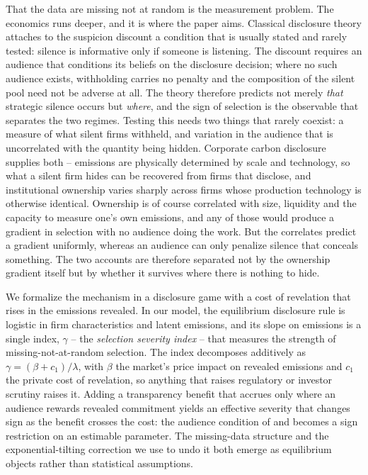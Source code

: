 \documentclass[a4paper,12pt]{article}
\newcommand{\citet}[1]{\textcite{#1}}
\begin{document}
That the data are missing not at random is the measurement problem. The economics runs deeper, and it is where the paper aims. Classical disclosure theory attaches to the suspicion discount a condition that is usually stated and rarely tested: silence is informative only if someone is listening. The discount requires an audience that conditions its beliefs on the disclosure decision; where no such audience exists, withholding carries no penalty and the composition of the silent pool need not be adverse at all. The theory therefore predicts not merely \emph{that} strategic silence occurs but \emph{where}, and the sign of selection is the observable that separates the two regimes. Testing this needs two things that rarely coexist: a measure of what silent firms withheld, and variation in the audience that is uncorrelated with the quantity being hidden. Corporate carbon disclosure supplies both -- emissions are physically determined by scale and technology, so what a silent firm hides can be recovered from firms that disclose, and institutional ownership varies sharply across firms whose production technology is otherwise identical. Ownership is of course correlated with size, liquidity and the capacity to measure one's own emissions, and any of those would produce a gradient in selection with no audience doing the work. But the correlates predict a gradient uniformly, whereas an audience can only penalize silence that conceals something. The two accounts are therefore separated not by the ownership gradient itself but by whether it survives where there is nothing to hide.

We formalize the mechanism in a disclosure game with a cost of revelation that rises in the emissions revealed. In our model, the equilibrium disclosure rule is logistic in firm characteristics and latent emissions, and its slope on emissions is a single index, $\gamma$ -- the \emph{selection severity index} -- that measures the strength of missing-not-at-random selection. The index decomposes additively as $\gamma=(\beta+c_1)/\lambda$, with $\beta$ the market's price impact on revealed emissions and $c_1$ the private cost of revelation, so anything that raises regulatory or investor scrutiny raises it. Adding a transparency benefit that accrues only where an audience rewards revealed commitment yields an effective severity that changes sign as the benefit crosses the cost: the audience condition of \citet{milgrom1981good} and \citet{verrecchia1983discretionary} becomes a sign restriction on an estimable parameter. The missing-data structure and the exponential-tilting correction we use to undo it both emerge as equilibrium objects rather than statistical assumptions.
\end{document}
